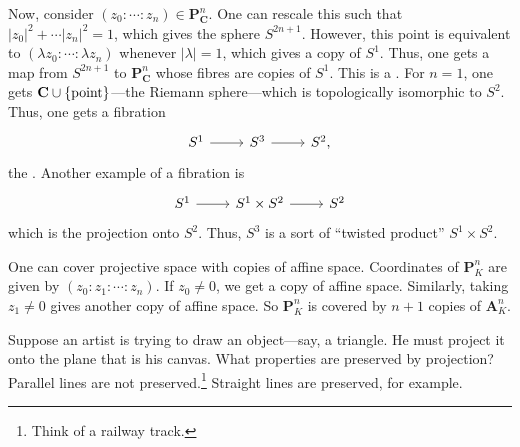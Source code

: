 \documentclass [11 pt, oneside] {article}
\begin{document}
Now, consider $(z_0:\cdots : z_n)\in \mathbf{P}^n_{\mathbf{C}}$. One can rescale this such that $\left\lvert z_0 \right\rvert ^2 + \cdots \left\lvert z_n \right\rvert ^2 = 1$, which gives the sphere $S^{2n+1}$. However, this point is equivalent to $(\lambda z_0:\cdots:\lambda z_n)$ whenever $\left\lvert \lambda \right\rvert =1$, which gives a copy of $S^1$. Thus, one gets a map from $S^{2n+1}$ to $\mathbf{P}^n_{\mathbf{C}}$ whose fibres are copies of $S^1$. This is a . For $n=1$, one gets $\mathbf C \cup \{ \textrm{point}\}$---the Riemann sphere---which is topologically isomorphic to $S^2$. Thus, one gets a fibration
\[
\begin{tikzcd}
S^1\ar[r]& S^3\ar[r]& S^2,
\end{tikzcd}
\]
the . Another example of a fibration is 
\[
\begin{tikzcd}
S^1\ar[r]& S^1\times S^2\ar[r]& S^2
\end{tikzcd}
\]
which is the projection onto $S^2$. Thus, $S^3$ is a sort of ``twisted product'' $S^1\times S^2$.


One can cover projective space with copies of affine space. Coordinates of $\mathbf{P}^n_K$ are given by $(z_0:z_1:\cdots : z_n)$. If $z_0\ne 0$, we get a copy of affine space. Similarly, taking $z_1\ne 0$ gives another copy of affine space. So $\mathbf{P}^n_K$ is covered by $n+1$ copies of $\mathbf{A}^n_K$.

Suppose an artist is trying to draw an object---say, a triangle. He must project it onto the plane that is his canvas. What properties are preserved by projection? Parallel lines are not preserved.\footnote{Think of a railway track.} Straight lines are preserved, for example.
\end{document}
